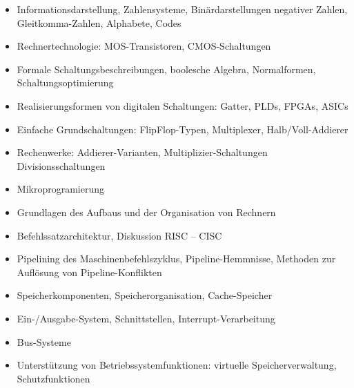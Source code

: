\begin{module}
\begin{content}
 \begin{itemize}\item Informationsdarstellung, Zahlensysteme, Binärdarstellungen negativer Zahlen, Gleitkomma-Zahlen, Alphabete, Codes  \item Rechnertechnologie: MOS-Transistoren, CMOS-Schaltungen  \item Formale Schaltungsbeschreibungen, boolesche Algebra, Normalformen, Schaltungsoptimierung  \item Realisierungsformen von digitalen Schaltungen: Gatter, PLDs, FPGAs, ASICs  \item Einfache Grundschaltungen: FlipFlop-Typen, Multiplexer, Halb/Voll-Addierer  \item Rechenwerke: Addierer-Varianten, Multiplizier-Schaltungen Divisionsschaltungen  \item Mikroprogramierung  \item Grundlagen des Aufbaus und der Organisation von Rechnern  \item Befehlssatzarchitektur, Diskussion RISC – CISC  \item Pipelining des Maschinenbefehlszyklus, Pipeline-Hemmnisse, Methoden zur Auflösung von Pipeline-Konflikten  \item Speicherkomponenten, Speicherorganisation, Cache-Speicher  \item Ein-/Ausgabe-System, Schnittstellen, Interrupt-Verarbeitung  \item Bus-Systeme  \item Unterstützung von Betriebssystemfunktionen: virtuelle Speicherverwaltung, Schutzfunktionen  \end{itemize}
\end{content}



\end{module}

